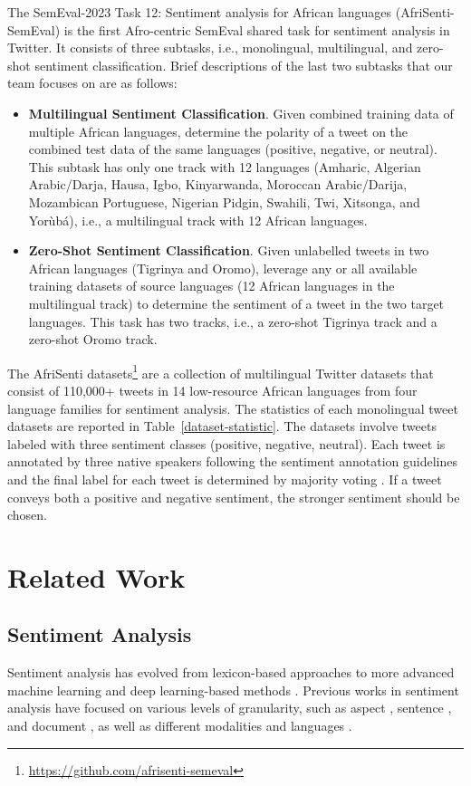 \documentclass[11pt]{article}
\newcommand*{\yoruba}{Yor\`ub\'a\xspace}
\begin{document}
The SemEval-2023 Task 12: Sentiment analysis for African languages 
(AfriSenti-SemEval) \citep{muhammadSemEval2023} is the first Afro-centric SemEval shared task for sentiment analysis in Twitter. It consists of three subtasks, i.e., monolingual, multilingual, and zero-shot sentiment classification. 
Brief descriptions of the last two subtasks that our team focuses on are as follows:
\begin{itemize}
 \item \textbf{Multilingual Sentiment Classification}. Given combined training data of multiple African languages, determine the polarity of a tweet on the combined test data of the same languages (positive, negative, or neutral). This subtask has only one track with 12 languages (Amharic, Algerian Arabic/Darja, Hausa, Igbo, Kinyarwanda, Moroccan Arabic/Darija, Mozambican Portuguese, Nigerian Pidgin, Swahili, Twi, Xitsonga, and \yoruba),
 i.e., a multilingual track with 12 African languages.
 \item \textbf{Zero-Shot Sentiment Classification}. Given unlabelled tweets in two African languages (Tigrinya and Oromo), leverage any or all available training datasets of source languages (12 African languages in the multilingual track) to determine the sentiment of a tweet in the two target languages. This task has two tracks, i.e., a zero-shot Tigrinya track and a zero-shot Oromo track.
\end{itemize}

The AfriSenti datasets\footnote{\url{https://github.com/afrisenti-semeval}} \citep{muhammad2023afrisenti} are a collection of multilingual Twitter datasets that consist of 110,000+ tweets in 14 low-resource African languages from four language families for sentiment analysis.
The statistics of each monolingual tweet datasets are reported in Table~\ref{dataset-statistic}.
The datasets involve tweets labeled with three sentiment classes (positive, negative, neutral).
Each tweet is annotated by three native speakers following the sentiment annotation guidelines \citet{mohammad-2016-practical} and 
the final label for each tweet is determined by majority voting \citep{DBLP:journals/tacl/DavaniDP22}. If a tweet conveys both a positive and negative sentiment, the stronger sentiment should be chosen. 


\section{Related Work}
\subsection{Sentiment Analysis}
Sentiment analysis has evolved from lexicon-based approaches to more advanced machine learning and deep learning-based methods \citep{MEDHAT20141093}. 
Previous works in sentiment analysis have focused on various levels of granularity, such as aspect \citep{DBLP:conf/semeval/PontikiGPPAM14}, sentence \citep{DBLP:conf/acl/HuWH20}, and document \citep{DBLP:conf/pkdd/WeiHZTZWHH20}, as well as different modalities \citep{DBLP:conf/emnlp/ZadehCPCM17,DBLP:conf/icassp/HuHWJM22} and languages \citep{DBLP:journals/ir/BoiyM09,DBLP:journals/csl/BalahurT14}.
\end{document}
